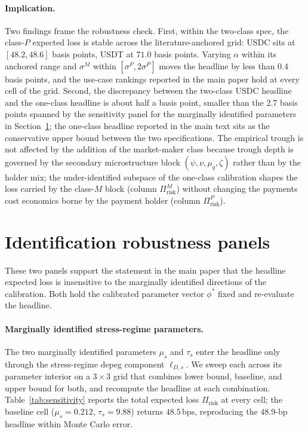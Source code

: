 \paragraph{Implication.} Two findings frame the robustness check. First, within the two-class spec, the class-$P$ expected loss is stable across the literature-anchored grid: USDC sits at $[48.2, 48.6]$ basis points, USDT at $71.0$ basis points. Varying $\alpha$ within its anchored range and $\sigma^M$ within $[\sigma^P, 2 \sigma^P]$ moves the headline by less than 0.4 basis points, and the use-case rankings reported in the main paper hold at every cell of the grid. Second, the discrepancy between the two-class USDC headline and the one-class headline is about half a basis point, smaller than the 2.7 basis points spanned by the sensitivity panel for the marginally identified parameters in Section~\ref{ia:robustness_panels}; the one-class headline reported in the main text sits as the conservative upper bound between the two specifications. The empirical trough is not affected by the addition of the market-maker class because trough depth is governed by the secondary microstructure block $(\psi, \nu, \mu_q, \zeta)$ rather than by the holder mix; the under-identified subspace of the one-class calibration shapes the loss carried by the class-$M$ block (column $\Pi_{\text{risk}}^M$) without changing the payments cost economics borne by the payment holder (column $\Pi_{\text{risk}}^P$).

\section{Identification robustness panels}\label{ia:robustness_panels}

These two panels support the statement in the main paper that the headline expected loss is insensitive to the marginally identified directions of the calibration. Both hold the calibrated parameter vector $\phi^*$ fixed and re-evaluate the headline.

\paragraph{Marginally identified stress-regime parameters.} The two marginally identified parameters $\mu_s$ and $\tau_s$ enter the headline only through the stress-regime depeg component $\ell_{D,s}$. We sweep each across its parameter interior on a $3 \times 3$ grid that combines lower bound, baseline, and upper bound for both, and recompute the headline at each combination. Table~\ref{tab:sensitivity} reports the total expected loss $\Pi_{\text{risk}}$ at every cell; the baseline cell ($\mu_s=0.212$, $\tau_s=9.88$) returns $48.5$\,bps, reproducing the $48.9$-bp headline within Monte Carlo error.

